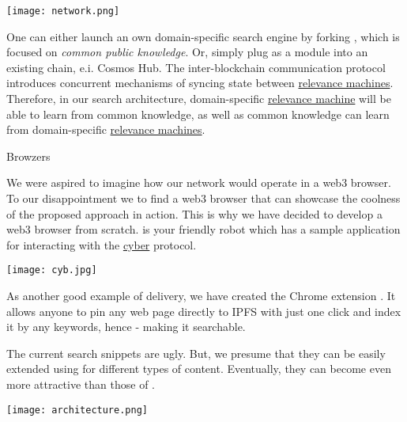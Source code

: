 \documentclass[8pt,oneside]{amsart}
\makeatletter
\newcommand{\linkred}[2]{\href{#1}{\color{red}{#2}}}
\renewcommand\subsection{\@startsection{subsection}
                                    {2}{\z@}
                                    {-3.25ex\@plus -1ex \@minus -.2ex}
                                    {0ex \@plus .2ex}
                                    {\play\Large}
                        }
\newcommand{\titleSection}[1]{\subsection{#1}}
\newenvironment{Figure}
  {\par\medskip\noindent\minipage{\linewidth}}
  {\endminipage\par\medskip}
\makeatother
\begin{document}
\begin{Figure}
    \centering
    \texttt{[image: network.png]}
\end{Figure}

One can either launch an own domain-specific search engine by forking \linkred{https://github.com/cybercongress/go-cyber}{go-cyber}, which is focused on \textit{common public knowledge}. Or, simply plug \linkred{https://github.com/cybercongress/go-cyber}{go-cyber} as a module into an existing chain, e.i. Cosmos Hub. The inter-blockchain communication protocol introduces concurrent mechanisms of syncing state between {\hyperref[relevance-machine]{relevance machines}}. Therefore, in our search architecture, domain-specific {\hyperref[relevance-machine]{relevance machine}} will be able to learn from common knowledge, as well as common knowledge can learn from domain-specific {\hyperref[relevance-machine]{relevance machines}}.

\titleSection{Browzers}\label{browzers}

We were aspired to imagine how our network would operate in a web3 browser. To our disappointment we \linkred{https://github.com/cybercongress/cyb/blob/master/docs/comparison.md}{were not able} to find a web3 browser that can showcase the coolness of the proposed approach in action. This is why we have decided to develop a web3 browser from scratch. \linkred{https://cyb.ai}{Cyb} is your friendly robot which has a sample \linkred{https://cyber.page}{.cyber} application for interacting with the {\hyperref[cyber]{cyber}} protocol.

\begin{Figure}
  \medskip
  \centering
  \texttt{[image: cyb.jpg]}
  \medskip
\end{Figure}

As another good example of delivery, we have created the Chrome extension \linkred{https://github.com/cybercongress/cyb-virus}{cyb-virus}. It allows anyone to pin any web page directly to IPFS with just one click and index it by any keywords, hence - making it searchable.

The current search snippets are ugly. But, we presume that they can be easily extended using \linkred{https://github.com/ipld/specs}{IPLD} for different types of content. Eventually, they can become even more attractive than those of \linkred{https://google.com}{Google}.

\begin{Figure}
    \centering
    \texttt{[image: architecture.png]}
\end{Figure}
\end{document}
